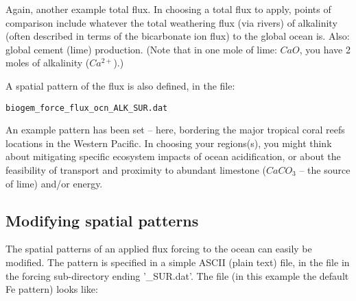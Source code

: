 Again, another example total flux. In choosing a total flux to apply, points of comparison include whatever the total weathering flux (via rivers) of alkalinity (often described in terms of the bicarbonate ion flux) to the global ocean is. Also: global cement (lime) production. (Note that in one mole of lime: \(CaO\), you have 2 moles of alkalinity (\(Ca^{2+}\)).)

\vspace{1mm}
A spatial pattern of the flux is also defined, in the file:
\vspace{-2mm}\small\begin{verbatim}
biogem_force_flux_ocn_ALK_SUR.dat
\end{verbatim}\normalsize\vspace{-2mm}

An example pattern has been set – here, bordering the major tropical coral reefs locations in the Western Pacific. In choosing your regions(s), you might think about mitigating specific ecosystem impacts of ocean acidification, or about the feasibility of transport and proximity to abundant limestone (\(CaCO_{3}\) – the source of lime) and/or energy.


\subsection{Modifying spatial patterns}

\vspace{2mm}
The spatial patterns of an applied flux forcing to the ocean can easily be modified. The pattern is specified in a simple ASCII (plain text) file, in the file in the forcing sub-directory ending '\textsf{\footnotesize \_SUR.dat}'. The file (in this example the default Fe pattern) looks like:

\newpage

